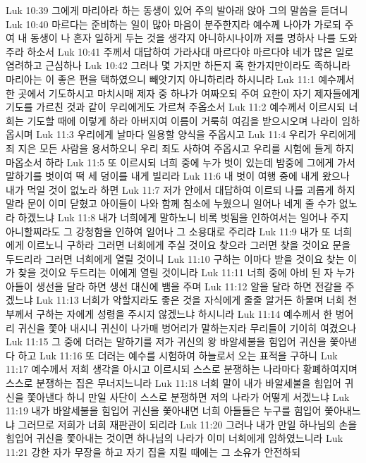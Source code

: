 Luk 10:39  그에게 마리아라 하는 동생이 있어 주의 발아래 앉아 그의 말씀을 듣더니
Luk 10:40  마르다는 준비하는 일이 많아 마음이 분주한지라 예수께 나아가 가로되 주여 내 동생이 나 혼자 일하게 두는 것을 생각지 아니하시나이까 저를 명하사 나를 도와주라 하소서
Luk 10:41  주께서 대답하여 가라사대 마르다야 마르다야 네가 많은 일로 염려하고 근심하나
Luk 10:42  그러나 몇 가지만 하든지 혹 한가지만이라도 족하니라 마리아는 이 좋은 편을 택하였으니 빼앗기지 아니하리라 하시니라
Luk 11:1  예수께서 한 곳에서 기도하시고 마치시매 제자 중 하나가 여짜오되 주여 요한이 자기 제자들에게 기도를 가르친 것과 같이 우리에게도 가르쳐 주옵소서
Luk 11:2  예수께서 이르시되 너희는 기도할 때에 이렇게 하라 아버지여 이름이 거룩히 여김을 받으시오며 나라이 임하옵시며
Luk 11:3  우리에게 날마다 일용할 양식을 주옵시고
Luk 11:4  우리가 우리에게 죄 지은 모든 사람을 용서하오니 우리 죄도 사하여 주옵시고 우리를 시험에 들게 하지 마옵소서 하라
Luk 11:5  또 이르시되 너희 중에 누가 벗이 있는데 밤중에 그에게 가서 말하기를 벗이여 떡 세 덩이를 내게 빌리라
Luk 11:6  내 벗이 여행 중에 내게 왔으나 내가 먹일 것이 없노라 하면
Luk 11:7  저가 안에서 대답하여 이르되 나를 괴롭게 하지 말라 문이 이미 닫혔고 아이들이 나와 함께 침소에 누웠으니 일어나 네게 줄 수가 없노라 하겠느냐
Luk 11:8  내가 너희에게 말하노니 비록 벗됨을 인하여서는 일어나 주지 아니할찌라도 그 강청함을 인하여 일어나 그 소용대로 주리라
Luk 11:9  내가 또 너희에게 이르노니 구하라 그러면 너희에게 주실 것이요 찾으라 그러면 찾을 것이요 문을 두드리라 그러면 너희에게 열릴 것이니
Luk 11:10  구하는 이마다 받을 것이요 찾는 이가 찾을 것이요 두드리는 이에게 열릴 것이니라
Luk 11:11  너희 중에 아비 된 자 누가 아들이 생선을 달라 하면 생선 대신에 뱀을 주며
Luk 11:12  알을 달라 하면 전갈을 주겠느냐
Luk 11:13  너희가 악할지라도 좋은 것을 자식에게 줄줄 알거든 하물며 너희 천부께서 구하는 자에게 성령을 주시지 않겠느냐 하시니라
Luk 11:14  예수께서 한 벙어리 귀신을 쫓아 내시니 귀신이 나가매 벙어리가 말하는지라 무리들이 기이히 여겼으나
Luk 11:15  그 중에 더러는 말하기를 저가 귀신의 왕 바알세불을 힘입어 귀신을 쫓아낸다 하고
Luk 11:16  또 더러는 예수를 시험하여 하늘로서 오는 표적을 구하니
Luk 11:17  예수께서 저희 생각을 아시고 이르시되 스스로 분쟁하는 나라마다 황폐하여지며 스스로 분쟁하는 집은 무너지느니라
Luk 11:18  너희 말이 내가 바알세불을 힘입어 귀신을 쫓아낸다 하니 만일 사단이 스스로 분쟁하면 저의 나라가 어떻게 서겠느냐
Luk 11:19  내가 바알세불을 힘입어 귀신을 쫓아내면 너희 아들들은 누구를 힘입어 쫓아내느냐 그러므로 저희가 너희 재판관이 되리라
Luk 11:20  그러나 내가 만일 하나님의 손을 힘입어 귀신을 쫓아내는 것이면 하나님의 나라가 이미 너희에게 임하였느니라
Luk 11:21  강한 자가 무장을 하고 자기 집을 지킬 때에는 그 소유가 안전하되
